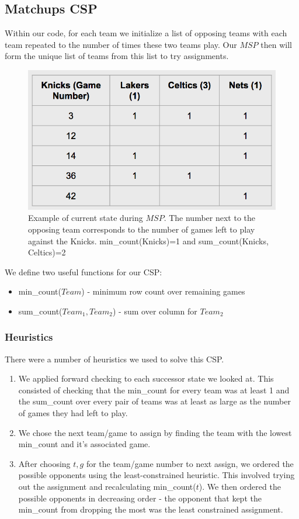 \documentclass{article}
\begin{document}
	\subsection{Matchups CSP}
	Within our code, for each team we initialize a list of opposing teams with each team repeated to the number of times these two teams play. Our $MSP$ then will form the unique list of teams from this list to try assignments.

	\begin{figure}
	\caption{Example of current state during $MSP$. The number next to the opposing team corresponds to the number of games left to play against the Knicks.
	min\_count(Knicks)=1 and sum\_count(Knicks, Celtics)=2}
	\includegraphics[scale=0.6]{matchups_game_counts}
	\end{figure}

	We define two useful functions for our CSP:
	\begin{itemize}
		\item min\_count($Team$) - minimum row count over remaining games
		\item sum\_count($Team_1, Team_2$) - sum over column for $Team_2$
	\end{itemize}

	\subsubsection{Heuristics}
	There were a number of heuristics we used to solve this CSP.
	\begin{enumerate}
		\item We applied forward checking to each successor state we looked at. This consisted of checking that the min\_count for every team was at least 1 and the sum\_count over every pair of teams was at least as large as the number of games they had left to play.
		\item We chose the next team/game to assign by finding the team with the lowest min\_count and it's associated game.
		\item After choosing $t,g$ for the team/game number to next assign, we ordered the possible opponents using the least-constrained heuristic. This involved trying out the assignment and recalculating min\_count($t$). We then ordered the possible opponents in decreasing order - the opponent that kept the min\_count from dropping the most was the least constrained assignment.
	\end{enumerate}
\end{document}
